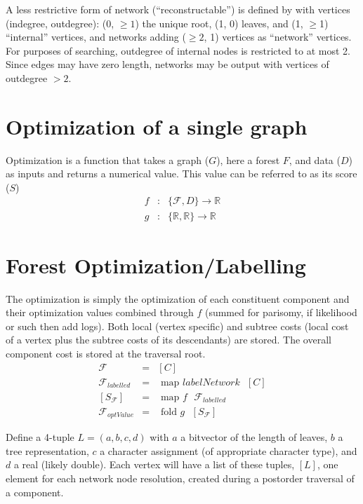 \documentclass[11pt]{article}
\begin{document}
 A less restrictive form of network (``reconstructable'') is defined by \cite{moretetal2004} with vertices (indegree, outdegree): 
 (0, $\ge 1$) the unique root, (1, 0) leaves, and (1, $\ge$1) ``internal'' vertices, and 
 networks adding ($\ge 2$, 1) vertices as ``network'' vertices.  For purposes of searching,
 outdegree of internal nodes is restricted to at most 2. Since edges may have zero length, networks may be output 
 with vertices of outdegree $> 2$.
 
 \section{Optimization of a single graph}\label{Optimization of a single graph}
 Optimization is a function that takes a graph ($G$), here a forest $F$, and data ($D$) as inputs and returns a numerical value.  
 This value can be referred to as its score ($S$)
 	\begin{eqnarray*}
 		f & : &  \{\mathcal{F}, D\} \rightarrow \mathbb{R}\\
		g & : & \{  \mathbb{R},  \mathbb{R} \} \rightarrow \mathbb{R}
	 \end{eqnarray*}
 
 \section{Forest Optimization/Labelling}\label{Forest Optimization/Labelling}
 The optimization is simply the optimization of each constituent component and their optimization values 
 combined through $f$ (summed for parisomy, if likelihood or such then add logs).  Both local (vertex  specific) and subtree costs (local cost of a vertex plus
 the subtree costs of its descendants) are stored.  The overall component cost is stored at the traversal root.
     \begin{eqnarray*}
     	\mathcal{F} & = & [C]\\
	\mathcal{F}_{labelled} & = & \text{ map } labelNetwork \text{ } [C]\\
	\left[ S_{\mathcal{F}} \right] &=& \text{ map } f \text{ } \mathcal{F}_{labelled}\\
	\mathcal{F}_{optValue} &=& \text{ fold } g \text{ } \left[ S_{\mathcal{F}} \right] 
    \end{eqnarray*}
 
 Define a 4-tuple $L = (a, b, c, d)$ with $a$ a bitvector of the length of leaves, $b$ a tree representation, $c$ a 
 character assignment (of appropriate character type), and $d$ a real (likely double). Each vertex will have a list of these
 tuples, $\left[L\right]$, one element for each network node resolution, created during a postorder traversal of a component.
 
\end{document}
